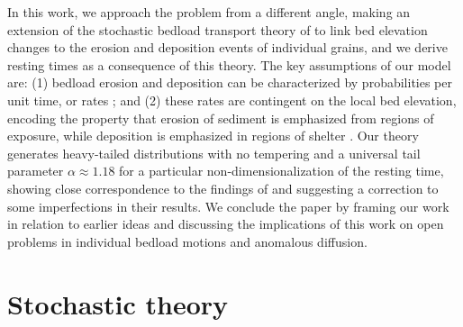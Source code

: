 \documentclass[draft]{agujournal2018}
\begin{document}
In this work, we approach the problem from a different angle, making an extension of the stochastic bedload transport theory of \citet{Ancey2008} to link bed elevation changes to the erosion and deposition events of individual grains, and we derive resting times as a consequence of this theory.
The key assumptions of our model are: (1) bedload erosion and deposition can be characterized by probabilities per unit time, or rates \citep[e.g.][]{Einstein1950, Ancey2008}; and (2) these rates are contingent on the local bed elevation, encoding the property that erosion of sediment is emphasized from regions of exposure, while deposition is emphasized in regions of shelter \citep[e.g.][]{Sawai1987, Wong2007}.
Our theory generates heavy-tailed distributions with no tempering and a universal tail parameter $\alpha \approx 1.18$ for a particular non-dimensionalization of the resting time, showing close correspondence to the findings of \citet{Martin2014} and suggesting a correction to some imperfections in their results.
We conclude the paper by framing our work in relation to earlier ideas and discussing the implications of this work on open problems in individual bedload motions and anomalous diffusion.

\section{Stochastic theory}
\label{sec:theory}
\end{document}
